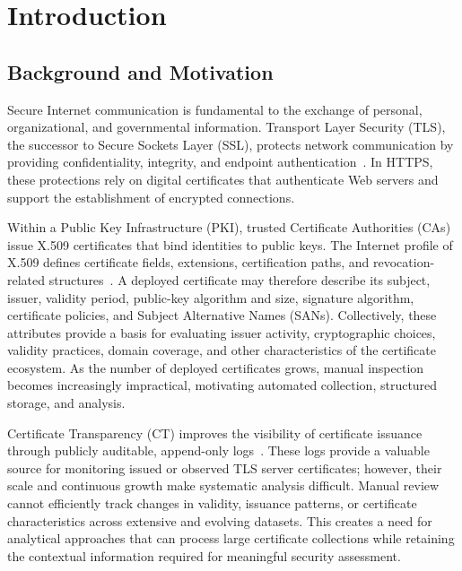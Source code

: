 
\chapter{Introduction}
\label{chap:introduction}

\section{Background and Motivation}
\label{sec:background-motivation}

Secure Internet communication is fundamental to the exchange of personal,
organizational, and governmental information. Transport Layer Security (TLS),
the successor to Secure Sockets Layer (SSL), protects network communication by
providing confidentiality, integrity, and endpoint authentication~\cite{rfc8446}.
In HTTPS, these protections rely on digital certificates that authenticate Web
servers and support the establishment of encrypted connections.

Within a Public Key Infrastructure (PKI), trusted Certificate Authorities (CAs)
issue X.509 certificates that bind identities to public keys. The Internet
profile of X.509 defines certificate fields, extensions, certification paths,
and revocation-related structures~\cite{rfc5280}. A deployed certificate may
therefore describe its subject, issuer, validity period, public-key algorithm
and size, signature algorithm, certificate policies, and Subject Alternative
Names (SANs). Collectively, these attributes provide a basis for evaluating
issuer activity, cryptographic choices, validity practices, domain coverage,
and other characteristics of the certificate ecosystem. As the number of
deployed certificates grows, manual inspection becomes increasingly
impractical, motivating automated collection, structured storage, and analysis.

Certificate Transparency (CT) improves the visibility of certificate issuance
through publicly auditable, append-only logs~\cite{rfc9162}. These logs provide
a valuable source for monitoring issued or observed TLS server certificates;
however, their scale and continuous growth make systematic analysis difficult.
Manual review cannot efficiently track changes in validity, issuance patterns,
or certificate characteristics across extensive and evolving datasets. This
creates a need for analytical approaches that can process large certificate
collections while retaining the contextual information required for meaningful
security assessment.

